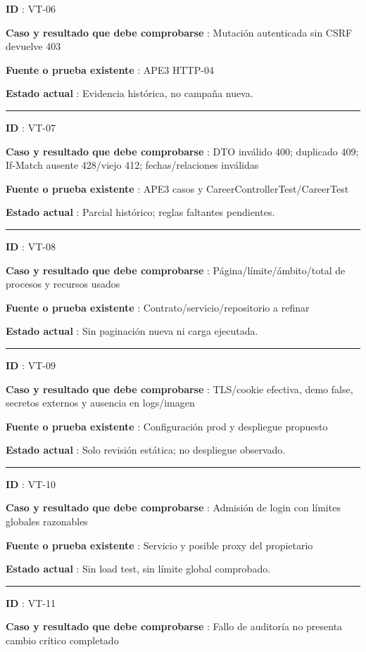 \documentclass[12pt,a4paper]{report}
\begin{document}
\textbf{ID }: VT-06

\textbf{Caso y resultado que debe comprobarse }: Mutación autenticada
sin CSRF devuelve 403

\textbf{Fuente o prueba existente }: APE3 HTTP-04

\textbf{Estado actual }: Evidencia histórica, no campaña nueva.

\medskip\hrule\medskip

\textbf{ID }: VT-07

\textbf{Caso y resultado que debe comprobarse }: DTO inválido 400;
duplicado 409; If-Match ausente 428/viejo 412; fechas/relaciones
inválidas

\textbf{Fuente o prueba existente }: APE3 casos y
CareerControllerTest/CareerTest

\textbf{Estado actual }: Parcial histórico; reglas faltantes pendientes.

\medskip\hrule\medskip

\textbf{ID }: VT-08

\textbf{Caso y resultado que debe comprobarse
}: Página/límite/ámbito/total de procesos y recursos usados

\textbf{Fuente o prueba existente }: Contrato/servicio/repositorio a
refinar

\textbf{Estado actual }: Sin paginación nueva ni carga ejecutada.

\medskip\hrule\medskip

\textbf{ID }: VT-09

\textbf{Caso y resultado que debe comprobarse }: TLS/cookie efectiva,
demo false, secretos externos y ausencia en logs/imagen

\textbf{Fuente o prueba existente }: Configuración prod y despliegue
propuesto

\textbf{Estado actual }: Solo revisión estática; no despliegue
observado.

\medskip\hrule\medskip

\textbf{ID }: VT-10

\textbf{Caso y resultado que debe comprobarse }: Admisión de login con
límites globales razonables

\textbf{Fuente o prueba existente }: Servicio y posible proxy del
propietario

\textbf{Estado actual }: Sin load test, sin límite global comprobado.

\medskip\hrule\medskip

\textbf{ID }: VT-11

\textbf{Caso y resultado que debe comprobarse }: Fallo de auditoría no
presenta cambio crítico completado
\end{document}
